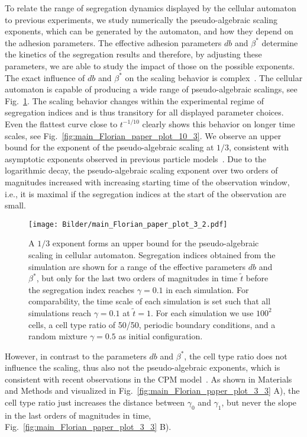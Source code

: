 \documentclass[10pt,letterpaper]{article}
\newcommand{\figref}[1]{Fig.~\ref{fig:#1}}
\begin{document}
To relate the range of segregation dynamics displayed by the cellular
automaton to previous experiments, we study numerically the
pseudo-algebraic scaling exponents, which can be generated by the
automaton, and how they depend on the adhesion parameters. The
effective adhesion parameters $db$ and $\beta^*$ determine the
kinetics of the segregation results and therefore, by adjusting these
parameters, we are able to study the impact of those on the possible
exponents. The exact influence of $db$ and $\beta^*$ on the scaling
behavior is complex~\cite{RosBoeLanVos2021}. The cellular automaton is
capable of producing a wide range of pseudo-algebraic scalings, see
\figref{main_Florian_paper_plot_3_2}. The scaling behavior changes
within the experimental regime of segregation indices and is thus
transitory for all displayed parameter choices. Even the flattest
curve close to $t^{-1/10}$ clearly shows this behavior on longer time
scales, see \figref{main_Florian_paper_plot_10_3}. We observe an upper
bound for the exponent of the pseudo-algebraic scaling at $1/3$,
consistent with asymptotic exponents observed in previous particle
models~\cite{NakIsh2011,BelThoBruAlmCha2008,BeaBru2011,
  StrJuuBauKabDuk2014,Kab2012}. Due to the logarithmic decay, the
pseudo-algebraic scaling exponent over two orders of magnitudes
increased with increasing starting time of the observation window,
i.e., it is maximal if the segregation indices at the start of the
observation are small.

\begin{figure}[ht!]
 \centering
 \texttt{[image: Bilder/main\_Florian\_paper\_plot\_3\_2.pdf]}
 \caption{A $1/3$ exponent forms an upper bound for the pseudo-algebraic
 scaling in cellular automaton. Segregation indices obtained
   from the simulation are shown for a range of the effective
   parameters $db$ and $\beta^*$, but only for the last two orders of
   magnitudes in time $\tilde{t}$ before the segregation index reaches
   $\gamma=0.1$ in each simulation. For comparability, the time scale
   of each simulation is set such that all simulations reach
   $\gamma=0.1$ at $\tilde{t}=1$. For each simulation we use $100^2$
   cells, a cell type ratio of 50/50, periodic boundary conditions, and
   a random mixture $\gamma=0.5$ as initial configuration.}
 \label{fig:main_Florian_paper_plot_3_2}
\end{figure}

However, in contrast to the parameters $db$ and $\beta^*$, the cell
type ratio does not influence the scaling, thus also not the pseudo-algebraic
exponents, which is consistent with recent observations in the CPM
model~\cite{Dur2021}. As shown in Materials and Methods and visualized
in \figref{main_Florian_paper_plot_3_3} A), the cell type ratio just
increases the distance between $\gamma_0$ and $\gamma_1$, but never
the slope in the last orders of magnitudes in time,
\figref{main_Florian_paper_plot_3_3} B).
\end{document}
